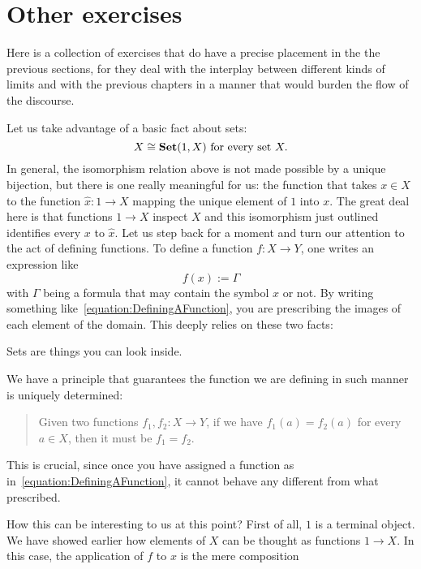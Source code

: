 
\section{Other exercises}

Here is a collection of exercises that do have a precise placement in the the previous sections, for they deal with the interplay between different kinds of limits and with the previous chapters in a manner that would burden the flow of  the discourse.

\begin{exercise}
Let us take advantage of a basic fact about sets:
\[X \cong \mathbf{Set}(1, X) \text{ for every set } X .\]
In general, the isomorphism relation above is not made possible by a unique bijection, but there is one really meaningful for us: the function that takes \(x \in X\) to the function \(\hat x : 1 \to X\) mapping the unique element of \(1\) into \(x\). The great deal here is that functions \(1 \to X\) inspect \(X\) and this isomorphism just outlined identifies every \(x\) to \(\hat x\).\newline
Let us step back for a moment and turn our attention to the act of defining functions. To define a function \(f : X \to Y\), one writes an expression like
\begin{equation}
f(x) := \Gamma \label{equation:DefiningAFunction}
\end{equation}
with \(\Gamma\) being a formula that may contain the symbol \(x\) or not. By writing something like~\eqref{equation:DefiningAFunction}, you are prescribing the images of each element of the domain. This deeply relies on these two facts:
\begin{tcbenum}
\item Sets are things you can look inside.
\item We have a principle that guarantees the function we are defining in such manner is uniquely determined:
\begin{quotation}
Given two functions \(f_1, f_2 : X \to Y\), if we have \(f_1(a) = f_2(a)\) for every \(a \in X\), then it must be \(f_1 = f_2\).
\end{quotation}
This is crucial, since once you have assigned a function as in~\eqref{equation:DefiningAFunction}, it cannot behave any different from what prescribed.
\end{tcbenum}
How this can be interesting to us at this point? First of all, \(1\) is a terminal object. We have showed earlier how elements of \(X\) can be thought as functions \(1 \to X\). In this case, the application of \(f\) to \(x\) is the mere composition

\end{exercise}
